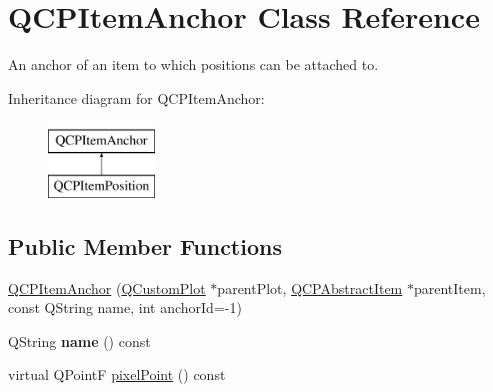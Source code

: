 \hypertarget{class_q_c_p_item_anchor}{}\section{Q\+C\+P\+Item\+Anchor Class Reference}
\label{class_q_c_p_item_anchor}


An anchor of an item to which positions can be attached to.  


Inheritance diagram for Q\+C\+P\+Item\+Anchor\+:\begin{figure}[H]
\begin{center}
\leavevmode
\includegraphics[height=2.000000cm]{class_q_c_p_item_anchor}
\end{center}
\end{figure}
\subsection*{Public Member Functions}
\begin{DoxyCompactItemize}
\item 
\hyperlink{class_q_c_p_item_anchor_aeb6b681d2bf324db40a915d32ec5624f}{Q\+C\+P\+Item\+Anchor} (\hyperlink{class_q_custom_plot}{Q\+Custom\+Plot} $\ast$parent\+Plot, \hyperlink{class_q_c_p_abstract_item}{Q\+C\+P\+Abstract\+Item} $\ast$parent\+Item, const Q\+String name, int anchor\+Id=-\/1)
\item 
\hypertarget{class_q_c_p_item_anchor_aad37cdf5a3f63428f61be739014e212e}{}\label{class_q_c_p_item_anchor_aad37cdf5a3f63428f61be739014e212e} 
Q\+String {\bfseries name} () const
\item 
virtual Q\+PointF \hyperlink{class_q_c_p_item_anchor_ae1a21d9471d1d788624cad297e1b8d6f}{pixel\+Point} () const
\end{DoxyCompactItemize}
